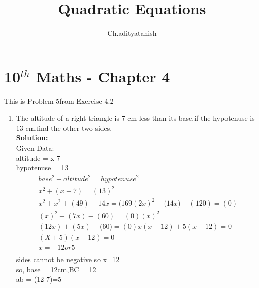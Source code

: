 \documentclass[12pt]{article}
\newcommand{\solution}{\noindent \textbf{Solution: }}
\begin{document}
\title{Quadratic Equations}
\author{Ch.adityatanish} %
\maketitle
\section*{10$^{th}$ Maths - Chapter 4}
This is Problem-5from Exercise 4.2
\begin{enumerate}
\item The altitude of a right triangle is 7 cm less than its base.if the hypotenuse is 13 cm,find the other two sides.\\
\solution \\
Given Data:\\
altitude = x-7\\
hypotenuse = 13\\
\begin{align}
{base}^2 + {altitude}^2 = {hypotenuse}^2\\
{x}^2 + {(x-7)} = {(13)}^2\\
{x}^2 + {x}^2 + {(49)}-{14x}={(169}
{(2x)}^2- {(14x})-{(120)}=  {(0)}\\
{(x)}^2 - {(7x)} - {(60)} = {(0)}{(x)}^2\\
{(12x)} + {(5x)} - {(60})= {(0)}
{x(x-12) + 5(x-12) = 0}\\
{(X+5)(x-12) = 0}\\
{x=-12 or 5}\\
\end{align}
sides cannot be negative so x=12\\
so, base = 12cm,{BC} = 12\\
ab = {(12-7)=5}\\

\end{enumerate}
\end{document}

